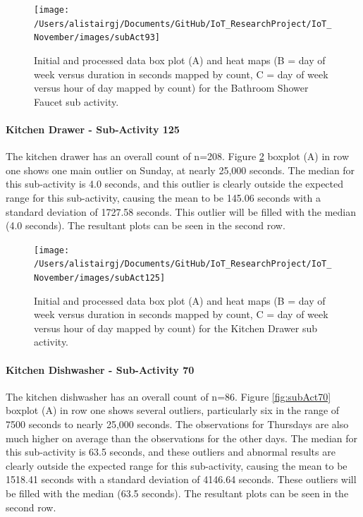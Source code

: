 \documentclass[11pt,]{article}
\let\oldparagraph\paragraph
\renewcommand{\paragraph}[1]{\oldparagraph{#1}\mbox{}}
\begin{document}
\begin{figure}[H]

{\centering \texttt{[image: /Users/alistairgj/Documents/GitHub/IoT\_ResearchProject/IoT\_November/images/subAct93]} 

}

\caption{Initial and processed data box plot (A) and heat maps (B = day of week versus duration in seconds mapped by count, C = day of week versus hour of day mapped by count) for the Bathroom Shower Faucet sub activity.}\label{fig:subAct93}
\end{figure}

\hypertarget{kitchen-drawer---sub-activity-125}{%
\paragraph{Kitchen Drawer - Sub-Activity
125}\label{kitchen-drawer---sub-activity-125}}

The kitchen drawer has an overall count of n=208. Figure
\ref{fig:subAct125} boxplot (A) in row one shows one main outlier on
Sunday, at nearly 25,000 seconds. The median for this sub-activity is
4.0 seconds, and this outlier is clearly outside the expected range for
this sub-activity, causing the mean to be 145.06 seconds with a standard
deviation of 1727.58 seconds. This outlier will be filled with the
median (4.0 seconds). The resultant plots can be seen in the second row.

\begin{figure}[H]

{\centering \texttt{[image: /Users/alistairgj/Documents/GitHub/IoT\_ResearchProject/IoT\_November/images/subAct125]} 

}

\caption{Initial and processed data box plot (A) and heat maps (B = day of week versus duration in seconds mapped by count, C = day of week versus hour of day mapped by count) for the Kitchen Drawer sub activity.}\label{fig:subAct125}
\end{figure}

\hypertarget{kitchen-dishwasher---sub-activity-70}{%
\paragraph{Kitchen Dishwasher - Sub-Activity
70}\label{kitchen-dishwasher---sub-activity-70}}

The kitchen dishwasher has an overall count of n=86. Figure
\ref{fig:subAct70} boxplot (A) in row one shows several outliers,
particularly six in the range of 7500 seconds to nearly 25,000 seconds.
The observations for Thursdays are also much higher on average than the
observations for the other days. The median for this sub-activity is
63.5 seconds, and these outliers and abnormal results are clearly
outside the expected range for this sub-activity, causing the mean to be
1518.41 seconds with a standard deviation of 4146.64 seconds. These
outliers will be filled with the median (63.5 seconds). The resultant
plots can be seen in the second row.
\end{document}
